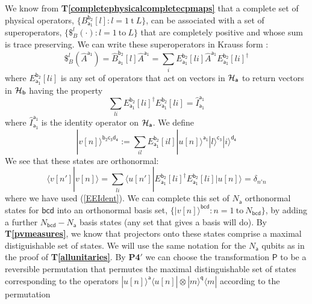 \documentclass[10pt]{article}
\begin{document}
We know from {\bf T\ref{completephysicalcompletecpmaps}} that a complete set of physical operators, $\{B_\mathsf{a_1}^\mathsf{b_2}[l]: l=1 ~\text{t}~L\}$, can be associated with a set of superoperators, $\{ \$_B^l(\cdot): l=1 ~\text{to}~ L\}$ that are completely positive and whose sum is trace preserving.   We can write these superoperators in Krauss form \cite{nielsen2000quantum}:
\begin{equation}\label{Choidecomp}
\$_B^l (\hat A^\mathsf{a_1}) =
\hat B_\mathsf{a_1}^\mathsf{b_2}[l] \hat A^\mathsf{a_1} = \sum_i E_\mathsf{a_1}^\mathsf{b_2}[li] \hat A^\mathsf{a_1} E_\mathsf{a_1}^\mathsf{b_2}[li]^\dagger
\end{equation}
where $E_\mathsf{a_1}^\mathsf{b_2}[li]$ is any set of operators that act on vectors in ${\cal H}_\mathsf{a}$ to return vectors in ${\cal H}_\mathsf{b}$ having the property
\begin{equation}\label{EEIdent}
\sum_{li} E_\mathsf{a_1}^\mathsf{b_2}[li]^\dagger E_\mathsf{a_1}^\mathsf{b_2}[li] = \hat I_\mathsf{a_1}^\mathsf{a_1}
\end{equation}
where $\hat I_\mathsf{a_1}^\mathsf{a_1}$ is the identity operator on ${\cal H}_\mathsf{a}$.  We define
\begin{equation}
|v[n]\rangle^\mathsf{b_2c_3d_4} := \sum_{il} E_\mathsf{a_1}^\mathsf{b_2}[il] |u[n]\rangle^\mathsf{a_1}|l\rangle^\mathsf{c_3}|i\rangle^\mathsf{d_4}
\end{equation}
We see that these states are orthonormal:
\begin{equation}
\langle v[n']|v[n]\rangle=
\sum_{li} \langle u[n']| E_\mathsf{a_1}^\mathsf{b_2}[li]^\dagger  E_\mathsf{a_1}^\mathsf{b_2}[li] | u[n] \rangle
=\delta_{n'n}
\end{equation}
where we have used (\ref{EEIdent}).   We can complete this set of $N_\mathsf{a}$ orthonormal states for $\mathsf{bcd}$ into an orthonormal basis set,
$\{ |v[n]\rangle^\mathsf{bcd}: n=1~\text{to}~N_\mathsf{bcd} \}$, by adding a further $N_\mathsf{bcd} - N_\mathsf{a}$ basis states (any set that gives a basis will do).  By {\bf T\ref{pvmeasures}}, we know that projectors onto these states comprise a maximal distiguishable set of states.  We will use the same notation for the $N_\mathsf{a}$ qubits as in the proof of {\bf T\ref{allunitaries}}.  By {\bf P4}$'$ we can choose the transformation $\mathsf P$ to be a reversible permutation that permutes the maximal distinguishable set of states corresponding to the operators $|u[n]\rangle^\mathsf{a}\langle u[n]|\otimes |m\rangle^\mathsf{q}\langle m|$ according to the permutation
\end{document}
